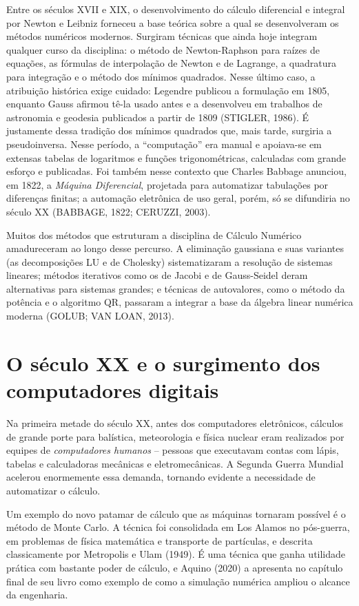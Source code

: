 \documentclass[12pt,a4paper,oneside]{report}
\begin{document}
Entre os séculos XVII e XIX, o desenvolvimento do cálculo diferencial e integral por Newton e
Leibniz forneceu a base teórica sobre a qual se desenvolveram os métodos numéricos modernos.
Surgiram técnicas que ainda hoje integram qualquer curso da disciplina: o método de
Newton-Raphson para raízes de equações, as fórmulas de interpolação de Newton e de Lagrange,
a quadratura para integração e o método dos mínimos quadrados. Nesse último caso, a atribuição
histórica exige cuidado: Legendre publicou a formulação em 1805, enquanto Gauss afirmou tê-la
usado antes e a desenvolveu em trabalhos de astronomia e geodesia publicados a partir de 1809
(STIGLER, 1986). É justamente dessa tradição dos mínimos quadrados que, mais tarde, surgiria
a pseudoinversa. Nesse período, a ``computação'' era manual e apoiava-se em extensas tabelas de
logaritmos e funções trigonométricas, calculadas com grande esforço e publicadas. Foi também nesse
contexto que Charles Babbage anunciou, em 1822, a \emph{Máquina Diferencial}, projetada para
automatizar tabulações por diferenças finitas; a automação eletrônica de uso geral, porém, só se
difundiria no século XX (BABBAGE, 1822; CERUZZI, 2003).

Muitos dos métodos que estruturam a disciplina de Cálculo Numérico amadureceram ao longo desse percurso. A eliminação gaussiana e suas variantes (as decomposições LU e de Cholesky) sistematizaram a resolução de sistemas lineares; métodos iterativos como os de Jacobi e de Gauss-Seidel deram alternativas para sistemas grandes; e técnicas de autovalores, como o método da potência e o algoritmo QR, passaram a integrar a base da álgebra linear numérica moderna (GOLUB; VAN LOAN, 2013).

\section{O século XX e o surgimento dos computadores digitais}

Na primeira metade do século XX, antes dos computadores eletrônicos, cálculos de grande porte
para balística, meteorologia e física nuclear eram realizados por equipes de \emph{computadores
humanos} -- pessoas que executavam contas com lápis, tabelas e calculadoras mecânicas e
eletromecânicas. A Segunda Guerra Mundial acelerou enormemente essa demanda, tornando
evidente a necessidade de automatizar o cálculo.

Um exemplo do novo patamar de cálculo que as máquinas tornaram possível é o método de Monte Carlo. A técnica foi consolidada em Los Alamos no pós-guerra, em problemas de física matemática e transporte de partículas, e descrita classicamente por Metropolis e Ulam (1949). É uma técnica que ganha utilidade prática com bastante poder de cálculo, e Aquino (2020) a apresenta no capítulo final de seu livro como exemplo de como a simulação numérica ampliou o alcance da engenharia.
\end{document}
